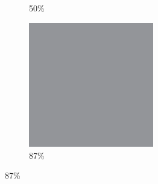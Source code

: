 \documentclass[12pt, fleqn]{report}                             %
\theoremstyle{break}                                            %
\begin{document}
\begin{figure}[ht!]
\begin{subfigure}[b]{0.4\linewidth}
          \caption{50\%}
        \end{subfigure}
        \begin{subfigure}[b]{0.4\linewidth}
          \includegraphics[width=0.6\textwidth]{Images/1/d.png}
          \caption{87\%}
        \end{subfigure}
      \end{figure}
\end{document}
